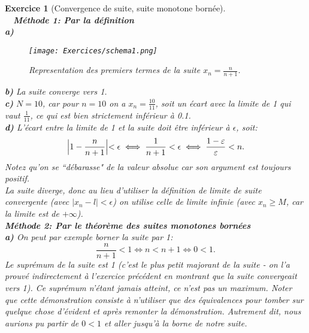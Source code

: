 \documentclass{article}
\theoremstyle{exercice}
\newtheorem{exercice}{Exercice}
\begin{document}
\begin{exercice}[Convergence de suite, suite monotone bornée]\\
    
$~~~$ \textbf{Méthode 1: Par la définition}\\

\textbf{a)} \\

\begin{figure}[H]
    \centering
    \texttt{[image: Exercices/schema1.png]}
    \caption{Representation des premiers termes de la suite $x_n=\frac{n}{n+1}$.}
    \label{fig:enter-label}
\end{figure}

\textbf{b)} La suite converge vers 1. \\

\textbf{c)} $N = 10$, car pour $n = 10$ on a $x_n =  \frac{10}{11}$, soit un écart avec la limite de 1 qui vaut $\frac{1}{11}$, ce qui est bien \textit{strictement} inférieur à 0.1.\\

\textbf{d)} L'écart entre la limite de 1 et la suite doit être inférieur à $\epsilon$, soit:
\begin{equation}
    \Bigl\lvert 1-\frac{n}{n+1}\Bigl\rvert < \epsilon \iff \frac{1}{n+1} < \epsilon \iff \frac{1-\varepsilon}{\varepsilon}<n.
\end{equation}
Notez qu'on se ``débarasse" de la valeur absolue car son argument est toujours positif. \\

\faLightbulbO \quad {} 
La suite diverge, donc au lieu d'utiliser la définition de limite de suite convergente (avec $|x_n - l| < \epsilon$) on utilise celle de limite infinie (avec $x_n \geq M$, car la limite est de $+ \infty$).\\

\textbf{Méthode 2: Par le théorème des suites monotones bornées}\\

\textbf{a)} On peut par exemple borner la suite par 1: 
\begin{equation}
    \frac{n}{n+1} < 1 \iff n < n+1 \iff 0 < 1.
\end{equation}
Le suprémum de la suite est 1 (c'est le plus petit majorant de la suite - on l'a prouvé indirectement à l'exercice précédent en montrant que la suite convergeait vers 1). Ce suprémum n'étant jamais atteint, ce n'est pas un maximum. Noter que cette démonstration consiste à n'utiliser que des équivalences pour tomber sur quelque chose d'évident et après remonter la démonstration. Autrement dit, nous aurions pu partir de $0<1$ et aller jusqu'à la borne de notre suite.\\


\end{exercice}
\end{document}
